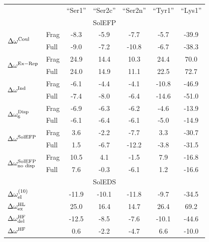 \documentclass[b5paper,oneside,fleqn,11pt]{book}
\begin{document}
\begin{refsection}
\begin{table}[t!]
\begin{tabular*}{1.0\textwidth}{@{\extracolsep{\fill} } ll ccccc }
\hline\hline
&& ``Ser1'' & ``Ser2c'' & ``Ser2n'' & ``Tyr1'' & ``Lys1'' \\
\multicolumn{7}{c}{SolEFP} \\ \hline
\multirow{2}{*}{$\Delta\omega^{\rm Coul}$}     & Frag &   -8.3   &  -5.9   &   -7.7   &   -5.7   & -39.9   \\
                                               & Full &   -9.0   &  -7.2   &  -10.8   &   -6.7   & -38.3   \\
\multirow{2}{*}{$\Delta\omega^{\rm Ex-Rep}$}   & Frag &   24.9   &  14.4   &   10.3   &   24.4   &  70.0   \\
                                               & Full &   24.0   &  14.9   &   11.1   &   22.5   &  72.7   \\
\multirow{2}{*}{$\Delta\omega^{\rm Ind}$}      & Frag &   -6.1   &  -4.4   &   -4.1   &  -10.8   & -46.9   \\
                                               & Full &   -7.4   &  -8.0   &   -6.4   &  -14.6   & -51.0   \\
\multirow{2}{*}{$\Delta\omega^{\rm Disp}_6$}   & Frag &   -6.9   &  -6.3   &   -6.2   &   -4.6   & -13.9   \\
                                               & Full &   -6.1   &  -6.4   &   -6.1   &   -5.0   & -14.9   \\
\multirow{2}{*}{$\Delta\omega^{\rm SolEFP}$}   & Frag &    3.6   &  -2.2   &   -7.7   &    3.3   & -30.7   \\
                                               & Full &    1.5   &  -6.7   &  -12.2   &   -3.8   & -31.5   \\
\multirow{2}{*}{$\Delta\omega^{\rm SolEFP}_{\text{no disp}}$}   
                                               & Frag &   10.5   &   4.1   &   -1.5   &    7.9   & -16.8   \\
                                               & Full &    7.6   &  -0.3   &   -6.1   &    1.2   & -16.6   \\
\multicolumn{7}{c}{SolEDS} \\  \hline
\multicolumn{2}{l}{$\Delta\omega^{(10)}_{\rm el}$}    &  -11.9   & -10.1   &  -11.8   &   -9.7   & -34.5   \\
\multicolumn{2}{l}{$\Delta\omega^{\rm HL}_{\rm ex}$}  &   25.0   &  16.4   &   14.7   &   26.4   &  69.2   \\
\multicolumn{2}{l}{$\Delta\omega^{\rm HF}_{\rm del}$} &  -12.5   &  -8.5   &   -7.6   &  -10.1   & -44.6   \\
\multicolumn{2}{l}{$\Delta\omega^{\rm HF}$}           &    0.6   &  -2.2   &   -4.7   &    6.6   & -10.0   \\

\end{tabular*}
\end{table}
\end{refsection}
\end{document}
